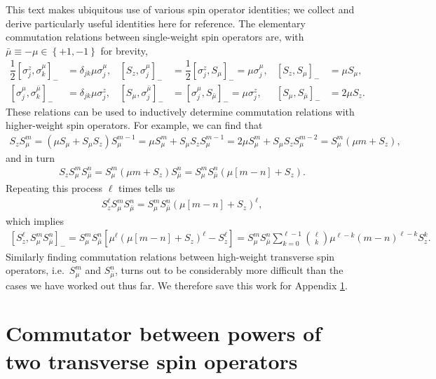 \documentclass[aps,notitlepage,nofootinbib,11pt]{revtex4-1}
\newcommand{\f}[2]{\dfrac{#1}{#2}} %
\newcommand{\p}[1]{\left(#1\right)} %
\renewcommand{\sp}[1]{\left[#1\right]} %
\renewcommand{\set}[1]{\left\{#1\right\}} %
\newcommand{\bmu}{{\bar\mu}}
\newcommand{\1}{\mathds{1}}
\begin{document}
This text makes ubiquitous use of various spin operator identities; we
collect and derive particularly useful identities here for reference.
The elementary commutation relations between single-weight spin
operators are, with $\bmu\equiv-\mu\in\set{+1,-1}$ for brevity,
\begin{align}
  \f12 \sp{\sigma_j^z,\sigma_k^\mu}_-
  &= \delta_{jk} \mu \sigma_j^\mu,
  &
  \sp{S_z,\sigma_j^\mu}_-
  &= \f12 \sp{\sigma_j^z,S_\mu}_- = \mu \sigma_j^\mu,
  &
  \sp{S_z,S_\mu}_-
  &= \mu S_\mu,
  \label{eq:comm_z_mu_base} \\
  \sp{\sigma_j^\mu,\sigma_k^\bmu}_-
  &= \delta_{jk} \mu \sigma_j^z,
  &
  \sp{S_\mu,\sigma_j^\bmu}_-
  &= \sp{\sigma_j^\mu,S_\bmu}_- = \mu \sigma_j^z,
  &
  \sp{S_\mu,S_\bmu}_-
  &= 2 \mu S_z.
  \label{eq:comm_mu_base}
\end{align}
These relations can be used to inductively determine commutation
relations with higher-weight spin operators.  For example, we can find
that
\begin{align}
  S_z S_\mu^m
  = \p{\mu S_\mu + S_\mu S_z} S_\mu^{m-1}
  = \mu S_\mu^m + S_\mu S_z S_\mu^{m-1}
  = 2 \mu S_\mu^m + S_\mu S_z S_\mu^{m-2}
  = S_\mu^m \p{\mu m + S_z},
  \label{eq:push_z_mu_single}
\end{align}
and in turn
\begin{align}
  S_z S_\mu^m S_\bmu^n
  = S_\mu^m \p{\mu m + S_z} S_\bmu^n
  = S_\mu^m S_\bmu^n \p{\mu\sp{m - n} + S_z}.
\end{align}
Repeating this process $\ell$ times tells us
\begin{align}
  S_z^\ell S_\mu^m S_\bmu^n
  = S_\mu^m S_\bmu^n \p{\mu\sp{m - n} + S_z}^\ell,
  \label{eq:push_z_mu}
\end{align}
which implies
\begin{align}
  \sp{S_z^\ell, S_\mu^m S_\bmu^n}_-
  = S_\mu^m S_\bmu^n \sp{\mu^\ell \p{\mu\sp{m - n} + S_z}^\ell - S_z^\ell}
  = S_\mu^m S_\bmu^n  \sum_{k=0}^{\ell-1} {\ell \choose k}
  \mu^{\ell-k} \p{m-n}^{\ell-k} S_z^k.
  \label{eq:comm_z_mu}
\end{align}
Similarly finding commutation relations between high-weight transverse
spin operators, i.e.~$S_\mu^m$ and $S_\bmu^n$, turns out to be
considerably more difficult than the cases we have worked out thus
far.  We therefore save this work for Appendix
\ref{sec:comm_transverse}.


\section{Commutator between powers of two transverse spin operators}
\label{sec:comm_transverse}
\end{document}
